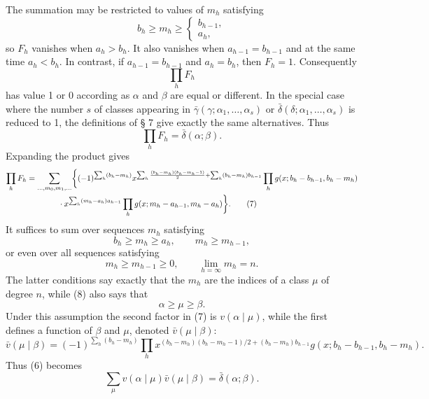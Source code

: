 \documentclass[11pt,a4paper]{article}
\begin{document}
The summation may be restricted to values of $m_h$ satisfying
\begin{equation}
 b_h\ge m_h\ge\begin{cases}b_{h-1},\\ a_h,
 \end{cases}
\tag{5}
\end{equation}
so $F_h$ vanishes when $a_h>b_h$. It also vanishes when $a_{h-1}=b_{h-1}$ and at the same time $a_h<b_h$. In contrast, if $a_{h-1}=b_{h-1}$ and $a_h=b_h$, then $F_h=1$. Consequently
\[
 \prod_hF_h
\]
has value 1 or 0 according as $\alpha$ and $\beta$ are equal or different. In the special case where the number $s$ of classes appearing in $\bar\gamma(\gamma;\alpha_1,\ldots,\alpha_s)$ or $\bar\delta(\delta;\alpha_1,\ldots,\alpha_s)$ is reduced to 1, the definitions of § 7 give exactly the same alternatives. Thus
\begin{equation}
 \prod_hF_h=\bar\delta(\alpha;\beta).
\tag{6}
\end{equation}
Expanding the product gives
\begin{align}
\prod_hF_h
&=\sum_{\ldots,m_0,m_1,\ldots}
\biggl\{(-1)^{\sum_h(b_h-m_h)}
 x^{\sum_h{(b_h-m_h)(b_h-m_h-1)\over2}+\sum_h(b_h-m_h)b_{h-1}}
 \prod_h g(x;b_h-b_{h-1},b_h-m_h)\notag\\
&\qquad\qquad\cdot
 x^{\sum_h(m_h-a_h)a_{h-1}}
 \prod_h g(x;m_h-a_{h-1},m_h-a_h)\biggr\}.
\tag{7}
\end{align}
It suffices to sum over sequences $m_h$ satisfying
\begin{equation}
 b_h\ge m_h\ge a_h,
 \qquad m_h\ge m_{h-1},
\tag{8}
\end{equation}
or even over all sequences satisfying
\begin{equation}
 m_h\ge m_{h-1}\ge0,
 \qquad \lim_{h=\infty}m_h=n.
\tag{9}
\end{equation}
The latter conditions say exactly that the $m_h$ are the indices of a class $\mu$ of degree $n$, while (8) also says that
\[
 \alpha\ge\mu\ge\beta.
\]
Under this assumption the second factor in (7) is $v(\alpha\mid\mu)$, while the first defines a function of $\beta$ and $\mu$, denoted $\bar v(\mu\mid\beta)$:
\begin{equation}
 \bar v(\mu\mid\beta)=(-1)^{\sum_h(b_h-m_h)}
 \prod_h x^{(b_h-m_h)(b_h-m_h-1)/2+(b_h-m_h)b_{h-1}}
 g(x;b_h-b_{h-1},b_h-m_h).
\tag{10}
\end{equation}
Thus (6) becomes
\begin{equation}
 \sum_{\mu}v(\alpha\mid\mu)\bar v(\mu\mid\beta)=\bar\delta(\alpha;\beta).
\tag{11}
\end{equation}
\end{document}
